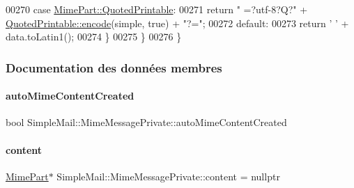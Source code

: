 \begin{DoxyCode}
00270         \textcolor{keywordflow}{case} \hyperlink{class_simple_mail_1_1_mime_part_ae67a2f5406958b95b18bf31a7bbeb5c9a29b5533d69a04cfef2c3ff6538c44db0}{MimePart::QuotedPrintable}:
00271             \textcolor{keywordflow}{return} \textcolor{stringliteral}{" =?utf-8?Q?"} + \hyperlink{class_simple_mail_1_1_quoted_printable_a8426b74cafe1c93232ac60d3f077c9e8}{QuotedPrintable::encode}(simple, \textcolor{keyword}{true}) + \textcolor{stringliteral}{"?="};
00272         \textcolor{keywordflow}{default}:
00273             \textcolor{keywordflow}{return} \textcolor{charliteral}{' '} + data.toLatin1();
00274         \}
00275     \}
00276 \}
\end{DoxyCode}


\subsubsection{Documentation des données membres}
\mbox{\label{class_simple_mail_1_1_mime_message_private_ac1fc811c2963e2b2027396a86a7257e6}} 
\paragraph{\texorpdfstring{auto\+Mime\+Content\+Created}{autoMimeContentCreated}}
{\footnotesize\ttfamily bool Simple\+Mail\+::\+Mime\+Message\+Private\+::auto\+Mime\+Content\+Created}

\mbox{\label{class_simple_mail_1_1_mime_message_private_a31f25b224455b2e8dafbdc1d6cfed3de}} 
\paragraph{\texorpdfstring{content}{content}}
{\footnotesize\ttfamily \hyperlink{class_simple_mail_1_1_mime_part}{Mime\+Part}$\ast$ Simple\+Mail\+::\+Mime\+Message\+Private\+::content = nullptr}


